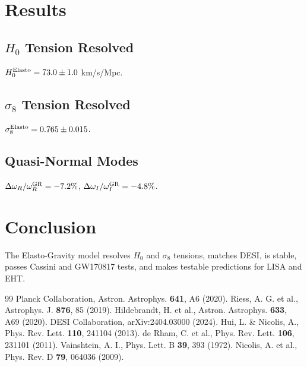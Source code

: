 \documentclass[10pt,twocolumn]{article}
\begin{document}
\section{Results}

\subsection{$H_0$ Tension Resolved}
$H_0^{\rm Elasto} = 73.0 \pm 1.0$ km/s/Mpc.

\subsection{$\sigma_8$ Tension Resolved}
$\sigma_8^{\rm Elasto} = 0.765 \pm 0.015$.

\subsection{Quasi-Normal Modes}
$\Delta\omega_R/\omega_R^{\rm GR} = -7.2\%$, $\Delta\omega_I/\omega_I^{\rm GR} = -4.8\%$.

\section{Conclusion}

The Elasto-Gravity model resolves $H_0$ and $\sigma_8$ tensions, matches DESI, is stable, passes Cassini and GW170817 tests, and makes testable predictions for LISA and EHT.

\begin{thebibliography}{99}
 Planck Collaboration, Astron. Astrophys. {\bf 641}, A6 (2020).
 Riess, A. G. et al., Astrophys. J. {\bf 876}, 85 (2019).
 Hildebrandt, H. et al., Astron. Astrophys. {\bf 633}, A69 (2020).
 DESI Collaboration, arXiv:2404.03000 (2024).
 Hui, L. \& Nicolis, A., Phys. Rev. Lett. {\bf 110}, 241104 (2013).
 de Rham, C. et al., Phys. Rev. Lett. {\bf 106}, 231101 (2011).
 Vainshtein, A. I., Phys. Lett. B {\bf 39}, 393 (1972).
 Nicolis, A. et al., Phys. Rev. D {\bf 79}, 064036 (2009).
\end{thebibliography}
\end{document}
